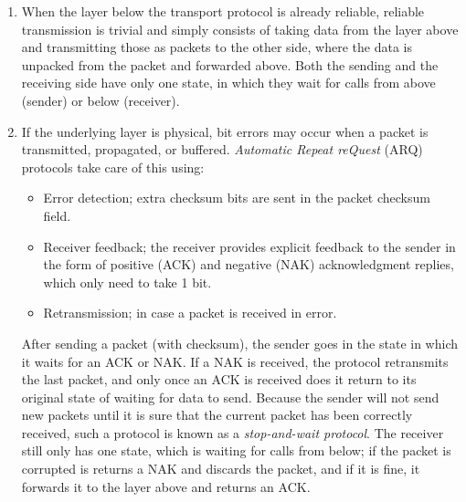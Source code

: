 \documentclass[8pt, table, xcdraw]{article}%
\begin{document}
\begin{enumerate}
    \item When the layer below the transport protocol is already reliable, reliable transmission is trivial and simply consists of taking data from the layer above and transmitting those as packets to the other side, where the data is unpacked from the packet and forwarded above. Both the sending and the receiving side have only one state, in which they wait for calls from above (sender) or below (receiver).
    \item If the underlying layer is physical, bit errors may occur when a packet is transmitted, propagated, or buffered. \emph{Automatic Repeat reQuest} (ARQ) protocols take care of this using:

    \begin{itemize}
        \item Error detection; extra checksum bits are sent in the packet checksum field.
        \item Receiver feedback; the receiver provides explicit feedback to the sender in the form of positive (ACK) and negative (NAK) acknowledgment replies, which only need to take 1 bit.
        \item Retransmission; in case a packet is received in error.
    \end{itemize}
    
    After sending a packet (with checksum), the sender goes in the state in which it waits for an ACK or NAK. If a NAK is received, the protocol retransmits the last packet, and only once an ACK is received does it return to its original state of waiting for data to send. Because the sender will not send new packets until it is sure that the current packet has been correctly received, such a protocol is known as a \emph{stop-and-wait protocol}. The receiver still only has one state, which is waiting for calls from below; if the packet is corrupted is returns a NAK and discards the packet, and if it is fine, it forwards it to the layer above and returns an ACK.
    

\end{enumerate}
\end{document}
